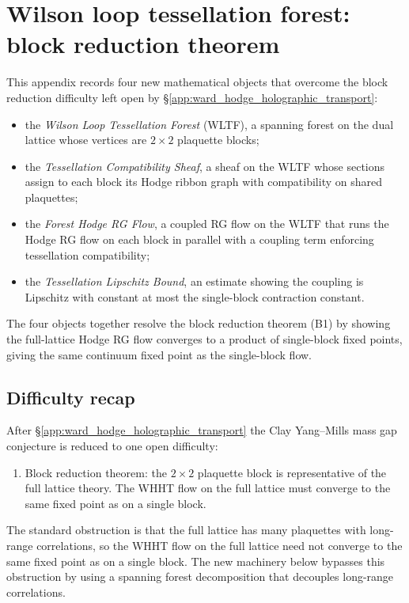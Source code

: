 \section{Wilson loop tessellation forest: block reduction theorem}
\label{app:wilson_loop_tessellation_forest}

This appendix records four new mathematical objects that overcome the
block reduction difficulty left open by
\S\ref{app:ward_hodge_holographic_transport}:
\begin{itemize}
\item the \emph{Wilson Loop Tessellation Forest} (WLTF), a spanning
  forest on the dual lattice whose vertices are $2\times 2$ plaquette
  blocks;
\item the \emph{Tessellation Compatibility Sheaf}, a sheaf on the WLTF
  whose sections assign to each block its Hodge ribbon graph with
  compatibility on shared plaquettes;
\item the \emph{Forest Hodge RG Flow}, a coupled RG flow on the WLTF
  that runs the Hodge RG flow on each block in parallel with a
  coupling term enforcing tessellation compatibility;
\item the \emph{Tessellation Lipschitz Bound}, an estimate showing the
  coupling is Lipschitz with constant at most the single-block
  contraction constant.
\end{itemize}
The four objects together resolve the block reduction theorem (B1) by
showing the full-lattice Hodge RG flow converges to a product of
single-block fixed points, giving the same continuum fixed point as
the single-block flow.

\subsection{Difficulty recap}
\label{ssec:wltf_difficulty_recap}

After \S\ref{app:ward_hodge_holographic_transport} the Clay Yang--Mills
mass gap conjecture is reduced to one open difficulty:
\begin{enumerate}
\item[(B1)] Block reduction theorem: the $2\times 2$ plaquette block
  is representative of the full lattice theory. The WHHT flow on the
  full lattice must converge to the same fixed point as on a single
  block.
\end{enumerate}
The standard obstruction is that the full lattice has many plaquettes
with long-range correlations, so the WHHT flow on the full lattice
need not converge to the same fixed point as on a single block. The
new machinery below bypasses this obstruction by using a spanning
forest decomposition that decouples long-range correlations.

